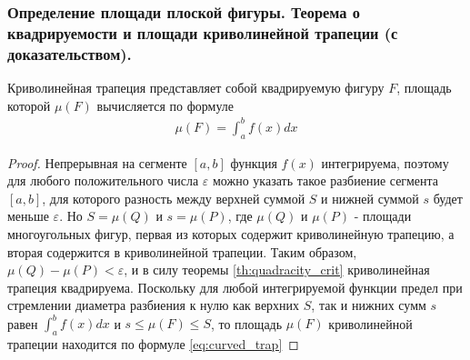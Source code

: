 \documentclass[10pt]{article}
\begin{document}
    \subsubsection{Определение площади плоской фигуры. Теорема о квадрируемости и площади криволинейной трапеции (с доказательством).}
    \begin{definition}
    \end{definition}
    \begin{corollary}
        Криволинейная трапеция представляет собой квадрируемую фигуру $F$, площадь которой $\mu(F)$ вычисляется по формуле
        \begin{gather}
            \mu(F) = \int_{a}^{b} f(x) dx \label{eq:curved_trap}
        \end{gather}
    \end{corollary}
    \begin{proof}
        Непрерывная на сегменте $[a, b]$ функция $f(x)$ интегрируема, поэтому для любого положительного числа $\varepsilon$ можно указать такое разбиение сегмента $[a, b]$, для которого разность между верхней суммой $S$ и нижней суммой $s$ будет меньше $\varepsilon$. Но $S=\mu(Q)$ и $s = \mu(P)$, где $\mu(Q)$ и $\mu(P)$ - площади многоугольных фигур, первая из которых содержит криволинейную трапецию, а вторая содержится в криволинейной трапеции. Таким образом, $\mu(Q) - \mu(P) < \varepsilon$, и в силу теоремы \ref{th:quadracity_crit} криволинейная трапеция квадрируема. Поскольку для любой интегрируемой функции предел при стремлении диаметра разбиения к нулю как верхних $S$, так и нижних сумм $s$ равен $\int_{a}^{b} f(x) dx$ и $s \leq \mu(F) \leq S$, то площадь $\mu(F)$ криволинейной трапеции находится по формуле \ref{eq:curved_trap}
    \end{proof}
\end{document}
